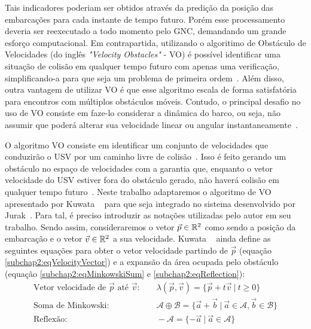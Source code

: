         Tais indicadores poderiam ser obtidos através da predição da posição das embarcações para cada instante de tempo futuro. Porém esse processamento deveria ser reexecutado a todo momento pelo GNC, demandando um grande esforço computacional. Em contrapartida, utilizando o algoritimo de Obstáculo de Velocidades (do inglês \textit{"Velocity Obstacles"} - VO) é possível identificar uma situação de colisão em qualquer tempo futuro com apenas uma verificação, simplificando-a para que seja um problema de primeira ordem~\cite{KUWATA2014110}. Além disso, outra vantagem de utilizar VO é que esse algoritmo escala de forma satisfatória para encontros com múltiplos obstáculos móveis. Contudo, o principal desafio no uso de VO consiste em faze-lo considerar a dinâmica do barco, ou seja, não assumir que poderá alterar sua velocidade linear ou angular instantaneamente~\cite{HUANG2019142}.
        
        O algoritmo VO consiste em identificar um conjunto de velocidades que conduzirão o USV por um caminho livre de colisão~\cite{HUANG2019142}. Isso é feito gerando um obstáculo no espaço de velocidades com a garantia que, enquanto o vetor velocidade do USV estiver fora do obstáculo gerado, não haverá colisão em qualquer tempo futuro~\cite{KUWATA2014110}. Neste trabalho adaptaremos o algoritmo de VO apresentado por Kuwata \etal ~\cite{KUWATA2014110} para que seja integrado no sistema desenvolvido por Jurak~\cite{JURAK2020}. Para tal, é preciso introduzir as notações utilizadas pelo autor em seu trabalho. Sendo assim, consideraremos o vetor $\vec{p} \in \mathbb{R}^2$ como sendo a posição da embarcação e o vetor $\vec{v} \in \mathbb{R}^2$ a sua velocidade. Kuwata \etal ~\cite{KUWATA2014110} ainda define as seguintes equações para obter o vetor velocidade partindo de $\vec{p}$ (equação \eqref{subchap2:eqVelocityVector}) e a expansão da área ocupada pelo obstáculo (equação \eqref{subchap2:eqMinkowskiSum} e \eqref{subchap2:eqReflection}):
        \begin{align}
            \text{Vetor velocidade de $\vec{p}$ até $\vec{v}$:}\quad&~\lambda(\vec{p}, \vec{v}) = \{\vec{p} + t\vec{v}~|~t \geq 0\}\label{subchap2:eqVelocityVector}\\
            \text{Soma de Minkowski:}\quad&~\mathcal{A} \oplus \mathcal{B}= \{\vec{a} + \vec{b}~|~\vec{a} \in \mathcal{A}, \vec{b} \in \mathcal{B}\}\label{subchap2:eqMinkowskiSum}\\
            \text{Reflexão:}\quad&~- \mathcal{A}= \{- \vec{a}~|~\vec{a} \in \mathcal{A}\}\label{subchap2:eqReflection}
        \end{align}
        
